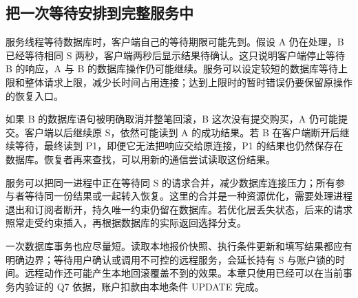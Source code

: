\subsection*{把一次等待安排到完整服务中}

服务线程等待数据库时，客户端自己的等待期限可能先到。假设 A 仍在处理，B 已经等待相同 S 两秒，客户端两秒后显示结果待确认。这只说明客户端停止等待 B 的响应，A 与 B 的数据库操作仍可能继续。服务可以设定较短的数据库等待上限和整体请求上限，减少长时间占用连接；达到上限时的暂时错误仍要保留原操作的恢复入口。

如果 B 的数据库语句被明确取消并整笔回滚，B 这次没有提交购买，A 仍可能提交。客户端以后继续原 S，依然可能读到 A 的成功结果。若 B 在客户端断开后继续等待，最终读到 P1，即便它无法把响应交给原连接，P1 的结果也仍然保存在数据库。恢复者再来查找，可以用新的通信尝试读取这份结果。

服务可以把同一进程中正在等待同 S 的请求合并，减少数据库连接压力；所有参与者等待同一份结果或一起转入恢复。这里的合并是一种资源优化，需要处理进程退出和订阅者断开，持久唯一约束仍留在数据库。若优化层丢失状态，后来的请求照常走受约束插入，再根据数据库的实际返回选择分支。

一次数据库事务也应尽量短。读取本地报价快照、执行条件更新和填写结果都应有明确边界；等待用户确认或调用不可控的远程服务，会延长持有 S 与账户锁的时间。远程动作还可能产生本地回滚覆盖不到的效果。本章只使用已经可以在当前事务内验证的 Q7 依据，账户扣款由本地条件 UPDATE 完成。
\FloatBarrier
